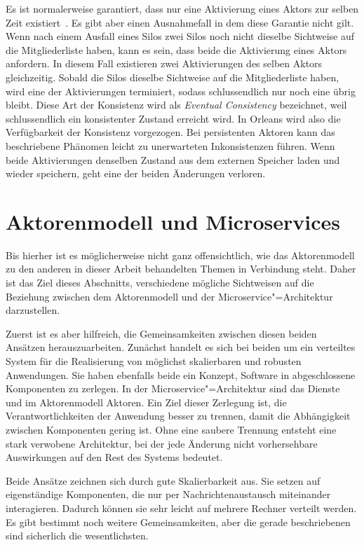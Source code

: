 Es ist normalerweise garantiert, dass nur eine Aktivierung eines Aktors zur selben Zeit existiert~\cite{Bernstein2014}. Es gibt aber einen Ausnahmefall in dem diese Garantie nicht gilt. Wenn nach einem Ausfall eines Silos zwei Silos noch nicht dieselbe Sichtweise auf die Mitgliederliste haben, kann es sein, dass beide die Aktivierung eines Aktors anfordern. In diesem Fall existieren zwei Aktivierungen des selben Aktors gleichzeitig. Sobald die Silos dieselbe Sichtweise auf die Mitgliederliste haben, wird eine der Aktivierungen terminiert, sodass schlussendlich nur noch eine übrig bleibt. Diese Art der Konsistenz wird als \textit{Eventual Consistency} bezeichnet, weil schlussendlich ein konsistenter Zustand erreicht wird. In Orleans wird also die Verfügbarkeit der Konsistenz vorgezogen. Bei persistenten Aktoren kann das beschriebene Phänomen leicht zu unerwarteten Inkonsistenzen führen. Wenn beide Aktivierungen denselben Zustand aus dem externen Speicher laden und wieder speichern, geht eine der beiden Änderungen verloren.

\section{Aktorenmodell und Microservices}

Bis hierher ist es möglicherweise nicht ganz offensichtlich, wie das Aktorenmodell zu den anderen in dieser Arbeit behandelten Themen in Verbindung steht. Daher ist das Ziel dieses Abschnitts, verschiedene mögliche Sichtweisen auf die Beziehung zwischen dem Aktorenmodell und der Microservice"=Architektur darzustellen.

Zuerst ist es aber hilfreich, die Gemeinsamkeiten zwischen diesen beiden Ansätzen herauszuarbeiten. Zunächst handelt es sich bei beiden um ein verteiltes System für die Realisierung von möglichst skalierbaren und robusten Anwendungen. Sie haben ebenfalls beide ein Konzept, Software in abgeschlossene Komponenten zu zerlegen. In der Microservice"=Architektur sind das Dienste und im Aktorenmodell Aktoren. Ein Ziel dieser Zerlegung ist, die Verantwortlichkeiten der Anwendung besser zu trennen, damit die Abhängigkeit zwischen Komponenten gering ist. Ohne eine saubere Trennung entsteht eine stark verwobene Architektur, bei der jede Änderung nicht vorhersehbare Auswirkungen auf den Rest des Systems bedeutet. 

Beide Ansätze zeichnen sich durch gute Skalierbarkeit aus. Sie setzen auf eigenständige Komponenten, die nur per Nachrichtenaustausch miteinander interagieren. Dadurch können sie sehr leicht auf mehrere Rechner verteilt werden. Es gibt bestimmt noch weitere Gemeinsamkeiten, aber die gerade beschriebenen sind sicherlich die wesentlichsten. 

